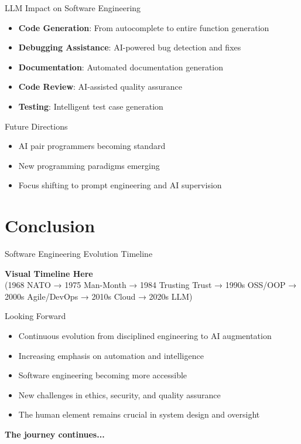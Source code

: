 \documentclass{beamer}
\begin{document}
\begin{frame}{LLM Impact on Software Engineering}
\begin{itemize}
    \item \textbf{Code Generation}: From autocomplete to entire function generation
    \item \textbf{Debugging Assistance}: AI-powered bug detection and fixes
    \item \textbf{Documentation}: Automated documentation generation
    \item \textbf{Code Review}: AI-assisted quality assurance
    \item \textbf{Testing}: Intelligent test case generation
\end{itemize}
\begin{block}{Future Directions}
\begin{itemize}
    \item AI pair programmers becoming standard
    \item New programming paradigms emerging
    \item Focus shifting to prompt engineering and AI supervision
\end{itemize}
\end{block}
\end{frame}

\section{Conclusion}

\begin{frame}{Software Engineering Evolution Timeline}
\begin{center}
    \textbf{Visual Timeline Here}\\
    (1968 NATO → 1975 Man-Month → 1984 Trusting Trust → 1990s OSS/OOP → 2000s Agile/DevOps → 2010s Cloud → 2020s LLM)
\end{center}
\end{frame}

\begin{frame}{Looking Forward}
\begin{itemize}
    \item Continuous evolution from disciplined engineering to AI augmentation
    \item Increasing emphasis on automation and intelligence
    \item Software engineering becoming more accessible
    \item New challenges in ethics, security, and quality assurance
    \item The human element remains crucial in system design and oversight
\end{itemize}
\begin{center}
    \textbf{The journey continues...}
\end{center}
\end{frame}
\end{document}
